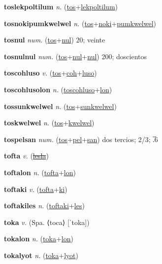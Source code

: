 \textbf{\hypertarget{toslekpoltilum}{toslekpoltilum}} \textit{n.} (\hyperlink{tos}{tos}+\allowbreak \hyperlink{lekpoltilum}{lekpoltilum})


\textbf{\hypertarget{tosnokipumkwelwel}{tosnokipumkwelwel}} \textit{n.} (\hyperlink{tos}{tos}+\allowbreak \hyperlink{noki}{noki}+\allowbreak \hyperlink{pumkwelwel}{pumkwelwel})


\textbf{\hypertarget{tosnul}{tosnul}} \textit{num.} (\hyperlink{tos}{tos}+\allowbreak \hyperlink{nul}{nul})
20; veinte

\textbf{\hypertarget{tosnulnul}{tosnulnul}} \textit{num.} (\hyperlink{tos}{tos}+\allowbreak \hyperlink{nul}{nul}+\allowbreak \hyperlink{nul}{nul})
200; doscientos

\textbf{\hypertarget{toscohluso}{toscohluso}} \textit{v.} (\hyperlink{tos}{tos}+\allowbreak \hyperlink{coh}{coh}+\allowbreak \hyperlink{luso}{luso})


\textbf{\hypertarget{toscohlusolon}{toscohlusolon}} \textit{n.} (\hyperlink{toscohluso}{toscohluso}+\allowbreak \hyperlink{lon}{lon})


\textbf{\hypertarget{tossunkwelwel}{tossunkwelwel}} \textit{n.} (\hyperlink{tos}{tos}+\allowbreak \hyperlink{sunkwelwel}{sunkwelwel})


\textbf{\hypertarget{toskwelwel}{toskwelwel}} \textit{n.} (\hyperlink{tos}{tos}+\allowbreak \hyperlink{kwelwel}{kwelwel})


\textbf{\hypertarget{tospelsan}{tospelsan}} \textit{num.} (\hyperlink{tos}{tos}+\allowbreak \hyperlink{pel}{pel}+\allowbreak \hyperlink{san}{san})
dos tercios; 2/3; .̅6

\textbf{\hypertarget{tofta}{tofta}} \textit{v.} (\hyperlink{lesla}{\sout{lesla}})


\textbf{\hypertarget{toftalon}{toftalon}} \textit{n.} (\hyperlink{tofta}{tofta}+\allowbreak \hyperlink{lon}{lon})


\textbf{\hypertarget{toftaki}{toftaki}} \textit{v.} (\hyperlink{tofta}{tofta}+\allowbreak \hyperlink{ki}{ki})


\textbf{\hypertarget{toftakiles}{toftakiles}} \textit{n.} (\hyperlink{toftaki}{toftaki}+\allowbreak \hyperlink{les}{les})


\textbf{\hypertarget{toka}{toka}} \textit{v.} (Spa. ⟨toca⟩ [ˈtoka])


\textbf{\hypertarget{tokalon}{tokalon}} \textit{n.} (\hyperlink{toka}{toka}+\allowbreak \hyperlink{lon}{lon})


\textbf{\hypertarget{tokalyot}{tokalyot}} \textit{n.} (\hyperlink{toka}{toka}+\allowbreak \hyperlink{lyot}{lyot})


